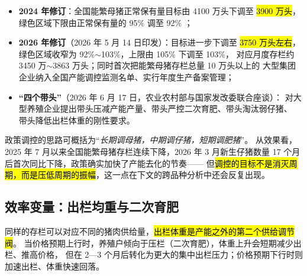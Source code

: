 \begin{itemize}
  \item \textbf{2024 年修订}：全国能繁母猪正常保有量目标由 4100 万头下调至
  \hl{3900 万头}，绿色区域下限由正常保有量的 95\% 调至 92\%
  \cite{moa2024capacity}；
  \item \textbf{2026 年修订}（2026 年 5 月 14 日印发）：目标进一步下调至
  \hl{3750 万头左右}，绿色区域收窄为 92\%$\sim$103\%，上限由 105\% 下调至 103\%，
  对应月度存栏约 3450 万$\sim$3863 万头；同时首次把能繁母猪存栏总量 10 万头以上的
  大型集团企业纳入全国产能调控监测名单、实行年度生产备案管理\cite{stcn2026capacity}；
  \item \textbf{“四个带头”}（2026 年 6 月 17 日，农业农村部与国家发改委联合座谈）：
  对大型养殖企业提出带头压减产能产量、带头严控二次育肥、带头淘汰弱仔猪、
  带头降低出栏体重的刚性要求\cite{jiemian2026pig}。
\end{itemize}

政策调控的思路可概括为“\emph{长期调母猪，中期调仔猪，短期调肥猪}”\cite{stcn2026capacity}。
从效果看，2025 年 7 月以来全国能繁母猪存栏连续下降，2026 年 3 月新生仔猪数量
17 个月后首次同比下降\cite{stcn2026capacity}，政策确实加快了产能去化的节奏——
但\hl{调控的目标不是消灭周期，而是压低周期的振幅}，这一点在下文的跨品种分析中还会反复出现。

\subsection{效率变量：出栏均重与二次育肥}
\label{sec:hog-weight}

同样的存栏可以对应不同的猪肉供给量，\hl{出栏体重是产能之外的第二个供给调节阀}。
当价格预期上行时，养殖户倾向于压栏（二次育肥），体重上升会短期减少出栏、推高价格，
但在 2---3 个月后转化为更大的集中出栏压力；价格预期下行时则加速出栏、体重快速回落。

